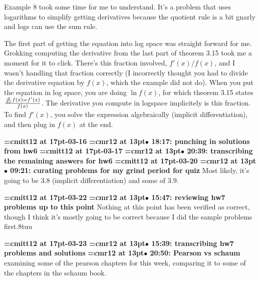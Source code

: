 Example 8 took some time for me to understand. It's a problem that uses logarithms to simplify getting derivatives because the quotient rule is a bit gnarly and logs can use the sum rule.
\par

The first part of getting the equation into log space was straight forward for me. Grokking computing the derivative  from the last part of theorem 3.15 took me a moment for it to click. There's this fraction involved, $f'(x)/f(x)$, and I wasn't handling that fraction correctly (I incorrectly thought you had to divide the derivative equation by $f(x)$, which the example did not do). When you put the equation in log space, you are doing $\ln f(x)$, for which theorem 3.15 states ${d \over dx} f(x) = f'(x) \over f(x)$. The derivative you compute in logspace implicitely is this fraction. To find $f'(x)$, you solve the expression algebraically (implicit differentiation), and then plug in $f(x)$ at the end.
\par

{\medskip\noindent\bf\font\titlefont=cmitt12 at 17pt-03-16}\medskip
{\smallskip\noindent\bf\font\titlefont=cmr12 at 13pt\titlefont $\bullet$ 18:17: punching in solutions from hw6}\smallskip
{\medskip\noindent\bf\font\titlefont=cmitt12 at 17pt-03-17}\medskip
{\smallskip\noindent\bf\font\titlefont=cmr12 at 13pt\titlefont $\bullet$ 20:39: transcribing the remaining answers for hw6}\smallskip
{\medskip\noindent\bf\font\titlefont=cmitt12 at 17pt-03-20}\medskip
{\smallskip\noindent\bf\font\titlefont=cmr12 at 13pt\titlefont $\bullet$ 09:21: curating problems for my grind period for quiz}\smallskip
Most likely, it's going to be 3.8 (implicit differentiation) and some of 3.9.
\par

{\medskip\noindent\bf\font\titlefont=cmitt12 at 17pt-03-22}\medskip
{\smallskip\noindent\bf\font\titlefont=cmr12 at 13pt\titlefont $\bullet$ 15:47: reviewing hw7 problems up to this point}\smallskip
Nothing at this point has been verified as correct, though I think it's mostly going to be correct because I did the sample problems first.8tuu
\par

{\medskip\noindent\bf\font\titlefont=cmitt12 at 17pt-03-23}\medskip
{\smallskip\noindent\bf\font\titlefont=cmr12 at 13pt\titlefont $\bullet$ 15:39: transcribing hw7 problems and solutions}\smallskip
{\smallskip\noindent\bf\font\titlefont=cmr12 at 13pt\titlefont $\bullet$ 20:50: Pearson vs schaum}\smallskip
examining some of the pearson chapters for this week, comparing it to some of the chapters in the schaum book.
\par


